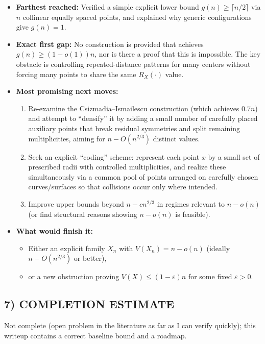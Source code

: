 \begin{itemize}[leftmargin=2.2em]
\item[(i)] \textbf{Farthest reached:}
Verified a simple explicit lower bound $g(n)\ge\lceil n/2\rceil$ via $n$ collinear equally spaced points, and explained why generic configurations give $g(n)=1$.
\item[(ii)] \textbf{Exact first gap:}
No construction is provided that achieves $g(n)\ge (1-o(1))n$, nor is there a proof that this is impossible.
The key obstacle is controlling repeated-distance patterns for many centers without forcing many points to share the same $R_X(\cdot)$ value.
\item[(iii)] \textbf{Most promising next moves:}
\begin{enumerate}[leftmargin=2.2em]
\item Re-examine the Csizmadia--Ismailescu construction (which achieves $0.7n$) and attempt to ``densify'' it by adding a small number of carefully placed auxiliary points that break residual symmetries and split remaining multiplicities, aiming for $n-O(n^{2/3})$ distinct values.
\item Seek an explicit ``coding'' scheme: represent each point $x$ by a small set of prescribed radii with controlled multiplicities, and realize these simultaneously via a common pool of points arranged on carefully chosen curves/surfaces so that collisions occur only where intended.
\item Improve upper bounds beyond $n-cn^{2/3}$ in regimes relevant to $n-o(n)$ (or find structural reasons showing $n-o(n)$ is feasible).
\end{enumerate}
\item[(iv)] \textbf{What would finish it:}
\begin{itemize}[leftmargin=2.2em]
\item Either an explicit family $X_n$ with $V(X_n)=n-o(n)$ (ideally $n-O(n^{2/3})$ or better),
\item or a new obstruction proving $V(X)\le (1-\varepsilon)n$ for some fixed $\varepsilon>0$.
\end{itemize}
\end{itemize}

\subsection*{7) COMPLETION ESTIMATE}

Not complete (open problem in the literature as far as I can verify quickly); this writeup contains a correct baseline bound and a roadmap.


